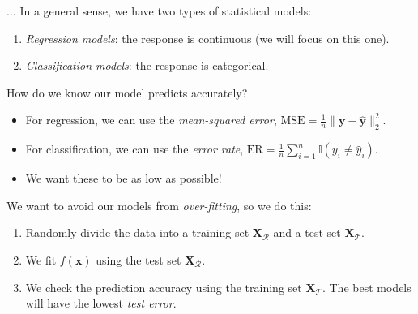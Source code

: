 \documentclass[8pt]{beamer}
\newcommand{\mydef}[1]{\textcolor{SteelBlue3}{\textit{#1}}} %
\begin{document}
\begin{frame}{$\ldots$}
In a general sense, we have two types of statistical models: %
\begin{enumerate}
    \item \mydef{Regression models}: the response is continuous (we will focus on this one). %
    \item \mydef{Classification models}: the response is categorical. %
\end{enumerate}

How do we know our model predicts accurately? %
\begin{itemize}
    \item For regression, we can use the \mydef{mean-squared error}, $\displaystyle \mathrm{MSE} = \frac{1}{n} \| \mathbf{y} - \hat{\mathbf{y}} \|_2^2$. %
    \item For classification, we can use the \mydef{error rate}, $\displaystyle \mathrm{ER} = \frac{1}{n} \sum_{i=1}^{n} \mathbb{I}(y_i \not= \hat{y}_i)$. %
    \item We want these to be as low as possible! %
\end{itemize}

We want to avoid our models from \mydef{over-fitting}, so we do this: %
\begin{enumerate}
    \item Randomly divide the data into a training set $\mathbf{X}_{\mathcal{R}}$ and a test set $\mathbf{X}_{\mathcal{T}}$. %
    \item We fit $f(\bm{x})$ using the test set $\mathbf{X}_{\mathcal{R}}$. %
    \item We check the prediction accuracy using the training set $\mathbf{X}_{\mathcal{T}}$. The best models will have the lowest \mydef{test error}. %
\end{enumerate}
    
\end{frame}
\end{document}

